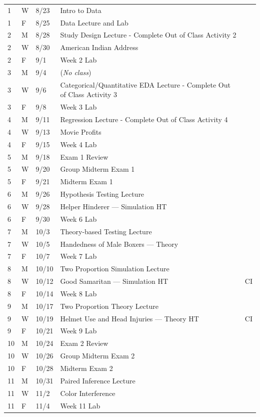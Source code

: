 \documentclass[
]{report}
\begin{document}
\begin{longtable}{|l|l|l|l|p{}|}
1& W& 8/23& Intro to Data \\*
1& F& 8/25& Data Lecture and Lab \\ \hline
2& M& 8/28& Study Design Lecture - Complete Out of Class Activity 2 \\*
2& W& 8/30& American Indian Address \\* 
2& F& 9/1& Week 2 Lab \\ \hline
3& M& 9/4& (\textit{No class}) \\*
3& W& 9/6& Categorical/Quantitative EDA Lecture - Complete Out of Class Activity 3 \\*
3& F& 9/8& Week 3 Lab \\ \hline
4& M& 9/11& Regression Lecture - Complete Out of Class Activity 4 \\*
4& W& 9/13& Movie Profits \\*
4& F& 9/15& Week 4 Lab \\ \hline
5& M& 9/18& Exam 1 Review \\*
5& W& 9/20& Group Midterm Exam 1 \\*    
5& F& 9/21& Midterm Exam 1 \\ \hline
6& M& 9/26& Hypothesis Testing Lecture \\*
6& W& 9/28& Helper Hinderer --- Simulation HT \\*   
6& F& 9/30& Week 6 Lab \\ \hline
7& M& 10/3& Theory-based Testing Lecture \\*
7& W& 10/5& Handedness of Male Boxers --- Theory\\*
7& F& 10/7& Week 7 Lab \\ \hline
8& M& 10/10& Two Proportion Simulation Lecture \\*
8& W& 10/12& Good Samaritan --- Simulation HT & CI \\*  
8& F& 10/14& Week 8 Lab \\ \hline
9& M& 10/17& Two Proportion Theory Lecture \\*
9& W& 10/19& Helmet Use and Head Injuries --- Theory HT & CI \\*    
9& F& 10/21& Week 9 Lab \\ \hline
10& M& 10/24& Exam 2 Review \\*
10& W& 10/26& Group Midterm Exam 2 \\*
10& F& 10/28& Midterm Exam 2\\ \hline
11& M& 10/31& Paired Inference Lecture \\*
11& W& 11/2& Color Interference \\* 
11& F& 11/4& Week 11 Lab \\ \hline

\end{longtable}
\end{document}
